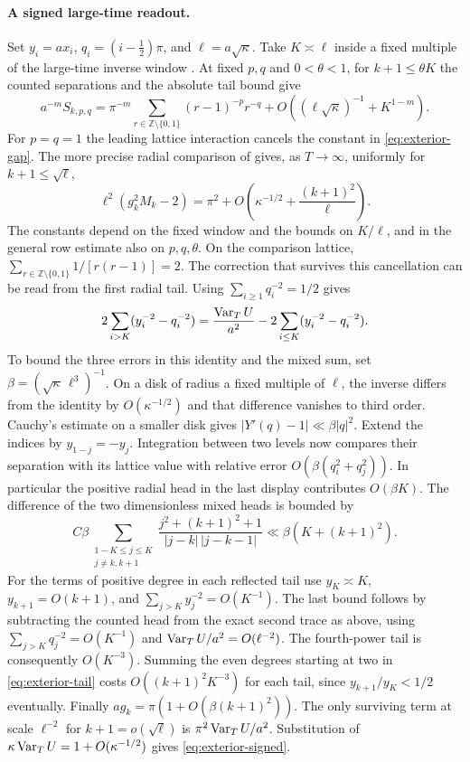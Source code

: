 \paragraph{A signed large-time readout.}
Set \(y_i=a x_i\), \(q_i=(i-\tfrac12)\pi\), and
\(\ell=a\sqrt{\kappa}\). Take \(K\asymp\ell\) inside a fixed multiple
of the large-time inverse window \cite{Founding08}. At fixed \(p,q\)
and \(0<\theta<1\), for \(k+1\le\theta K\) the counted separations and
the absolute tail bound give \cite{EZMixedAnchor}
\[
 a^{-m} S_{k,p,q}
 =\pi^{-m}\sum_{r\in\mathbb Z\setminus\{0,1\}}(r-1)^{-p}r^{-q}
    + O\!\left((\ell\sqrt{\kappa})^{-1}+K^{1-m}\right).
\]
For \(p=q=1\) the leading lattice interaction cancels the constant in
\eqref{eq:exterior-gap}. The more precise radial comparison of
\cite{EZMixedAnchor} gives, as \(T\to\infty\), uniformly for
\(k+1\le\sqrt{\ell}\),
\begin{equation}\label{eq:exterior-signed}
 \ell^2(g_k^2M_k-2)
   =\pi^2+O\!\left(\kappa^{-1/2}+\frac{(k+1)^2}{\ell}\right).
\end{equation}
The constants depend on the fixed window and the bounds on \(K/\ell\),
and in the general row estimate also on \(p,q,\theta\).
On the comparison lattice,
\(\sum_{r\in\mathbb Z\setminus\{0,1\}}1/[r(r-1)]=2\).
The correction that survives this cancellation can be read from the
first radial tail. Using \(\sum_{i\ge1}q_i^{-2}=1/2\) gives
\[
 2\sum_{i>K}(y_i^{-2}-q_i^{-2})
   =\frac{\operatorname{Var}_T U}{a^2}
      -2\sum_{i\le K}(y_i^{-2}-q_i^{-2}).
\]
To bound the three errors in this identity and the mixed sum, set
\(\beta=(\sqrt\kappa\,\ell^3)^{-1}\). On a disk of radius a fixed
multiple of \(\ell\), the inverse differs from the identity by
\(O(\kappa^{-1/2})\) and that difference vanishes to third order.
Cauchy's estimate on a smaller disk gives
\(|Y'(q)-1|\ll\beta |q|^2\). Extend the indices by
\(y_{1-j}=-y_j\). Integration between two levels now compares
their separation with its lattice value with relative error
\(O(\beta(q_i^2+q_j^2))\). In particular the positive radial head in
the last display contributes \(O(\beta K)\). The difference of the two
dimensionless mixed heads is bounded by
\[
 C\beta\!\!\sum_{\substack{1-K\le j\le K\\j\ne k,k+1}}
 \frac{j^2+(k+1)^2+1}{|j-k|\,|j-k-1|}
 \ll\beta(K+(k+1)^2).
\]
For the terms of positive degree in each reflected tail use
\(y_K\asymp K\), \(y_{k+1}=O(k+1)\), and
\(\sum_{j>K}y_j^{-2}=O(K^{-1})\). The last bound follows by
subtracting the counted head from the exact second trace as above,
using \(\sum_{j>K}q_j^{-2}=O(K^{-1})\) and \(\operatorname{Var}_T U/a^2=O(\ell^{-2})\).
The fourth-power tail is consequently \(O(K^{-3})\). Summing the even
degrees starting at two in \eqref{eq:exterior-tail} costs
\(O((k+1)^2 K^{-3})\) for each tail, since \(y_{k+1}/y_K<1/2\)
eventually. Finally \(a g_k=\pi(1+O(\beta(k+1)^2))\).
The only surviving term at scale \(\ell^{-2}\) for \(k+1=o(\sqrt\ell)\)
is \(\pi^2\operatorname{Var}_T U/a^2\). Substitution of
\(\kappa\operatorname{Var}_T U=1+O(\kappa^{-1/2})\) gives \eqref{eq:exterior-signed}.

